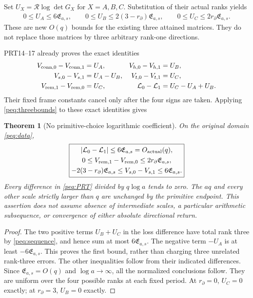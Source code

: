 \documentclass[11pt,a4paper]{article}
\newtheorem{theorem}{Theorem}
\begin{document}
Set $U_X=\mathcal R\log\det G_X$ for $X=A,B,C$. Substitution of their actual ranks yields
\begin{equation}
\boxed{\begin{gathered}
 0\le U_A\le6\mathfrak E_{a,s},\qquad
 0\le U_B\le2(3-r_\partial)\mathfrak E_{a,s},\qquad
 0\le U_C\le2r_\partial\mathfrak E_{a,s}.
\end{gathered}}\label{peq:threebounds}
\end{equation}
These are new $O(q)$ bounds for the existing three attained matrices. They do not replace those matrices by three arbitrary rank-one directions.

PRT14--17 already proves the exact identities
\begin{equation}
\begin{aligned}
 V_{{\rm conn},0}-V_{{\rm conn},1}&=U_A,&
 V_{h,0}-V_{h,1}&=U_B,\\
 V_{s,0}-V_{s,1}&=U_A-U_B,&
 V_{t,0}-V_{t,1}&=U_C,\\
 V_{{\rm rem},1}-V_{{\rm rem},0}&=U_C,&
 \mathcal L_0-\mathcal L_1&=U_C-U_A+U_B.
\end{aligned}\label{peq:PRT}
\end{equation}
Their fixed frame constants cancel only after the four signs are taken. Applying \eqref{peq:threebounds} to these exact identities gives
\begin{theorem}[No primitive-choice logarithmic coefficient]
On the original domain \eqref{peq:data},
\begin{equation}
\boxed{\begin{gathered}
 |\mathcal L_0-\mathcal L_1|\le6\mathfrak E_{a,s}=O_{\rm actual}(q),\\
 0\le V_{{\rm rem},1}-V_{{\rm rem},0}
                   \le2r_\partial\mathfrak E_{a,s},\\
 -2(3-r_\partial)\mathfrak E_{a,s}
 \le V_{s,0}-V_{s,1}\le6\mathfrak E_{a,s}.
\end{gathered}}\label{peq:result}
\end{equation}
Every difference in \eqref{peq:PRT} divided by $q\log a$ tends to zero. The $aq$ and every other scale strictly larger than $q$ are unchanged by the primitive endpoint. This assertion does not assume absence of intermediate scales, a particular arithmetic subsequence, or convergence of either absolute directional return.
\end{theorem}
\begin{proof}
The two positive terms $U_B+U_C$ in the loss difference have total rank three by \eqref{peq:sequence}, and hence sum at most $6\mathfrak E_{a,s}$. The negative term $-U_A$ is at least $-6\mathfrak E_{a,s}$. This proves the first bound, rather than charging three unrelated rank-three errors. The other inequalities follow from their indicated differences. Since $\mathfrak E_{a,s}=O(q)$ and $\log a\to\infty$, all the normalized conclusions follow. They are uniform over the four possible ranks at each fixed period. At $r_\partial=0$, $U_C=0$ exactly; at $r_\partial=3$, $U_B=0$ exactly.
\end{proof}
\end{document}

